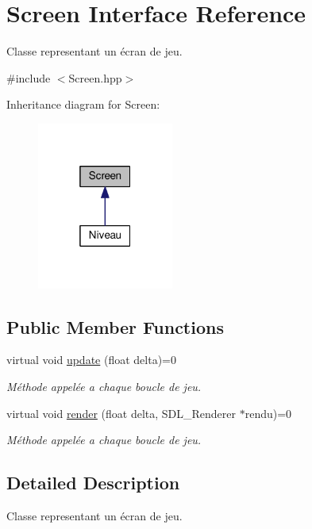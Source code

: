\hypertarget{class_screen}{}\section{Screen Interface Reference}
\label{class_screen}


Classe representant un écran de jeu.  




{\ttfamily \#include $<$Screen.\+hpp$>$}



Inheritance diagram for Screen\+:\nopagebreak
\begin{figure}[H]
\begin{center}
\leavevmode
\includegraphics[width=127pt]{class_screen__inherit__graph}
\end{center}
\end{figure}
\subsection*{Public Member Functions}
\begin{DoxyCompactItemize}
\item 
virtual void \hyperlink{class_screen_a6933698ce05938524e1764fa42fe8129}{update} (float delta)=0
\begin{DoxyCompactList}\small\item\em Méthode appelée a chaque boucle de jeu. \end{DoxyCompactList}\item 
virtual void \hyperlink{class_screen_a7d3402d0cab593a375c84254b864ee22}{render} (float delta, S\+D\+L\+\_\+\+Renderer $\ast$rendu)=0
\begin{DoxyCompactList}\small\item\em Méthode appelée a chaque boucle de jeu. \end{DoxyCompactList}\end{DoxyCompactItemize}


\subsection{Detailed Description}
Classe representant un écran de jeu. 

